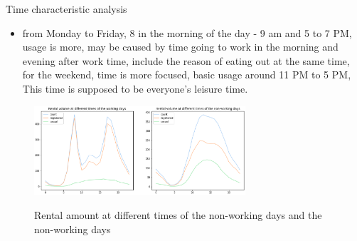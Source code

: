 \documentclass[
 size=14pt,
 paper=smartboard,  %
 mode=present, 		%
 display=slides, 	%
 style=tuliplab,  	%
 pauseslide,
 fleqn,leqno]{powerdot}
\begin{document}
\begin{slide}[toc=,bm=]{Time characteristic analysis}

\begin{itemize}
\item
from Monday to Friday, 8 in the morning of the day - 9 am and 5 to 7 PM, 
usage is more, may be caused by time going to work in the morning and 
evening after work time, include the reason of eating out at the same time,
 for the weekend, time is more focused, basic usage around 11 PM to 5 PM, 
 This time is supposed to be everyone's leisure time.
\end{itemize} 
\vspace{-1cm}  
\begin{figure}
  \centering
  \includegraphics[width=0.7\textwidth]{figures//time_trends_weekday.eps}\\
  \caption{Rental amount at different times of the non-working days and the non-working days} \label{framework}
\end{figure}
  
  
\end{slide}
\end{document}

